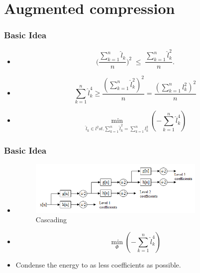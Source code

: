 \documentclass{beamer}
\begin{document}

\section{Augmented compression}
\begin{frame}
    \frametitle{Basic Idea}
    \begin{itemize}
        \item \[
                  \Big(\frac{\sum_{k=1}^{n}\hat{l}_k}{n}\Big)^2\;\le\;\frac{\sum_{k=1}^{n}\hat{l}_k^2}{n}.
              \]
        \item \[
                  \sum_{k=1}^{n}\hat{l}_k^4
                  \geq
                  \frac{(\sum_{k=1}^{n}\hat{l}_k^2)^2}{n}
                  =
                  \frac{(\sum_{k=1}^{n}l_k^2)^2}{n}
              \]
        \item \[
                  \min_{\hat{l}_k\in l^2 st. \sum_{k=1}^{n}\hat{l}_k^2=\sum_{k=1}^{n}l_k^2}(-\sum_{k=1}^{n}\hat{l}_k^4)
              \]
    \end{itemize}
\end{frame}
\begin{frame}
    \frametitle{Basic Idea}
    \begin{itemize}
        \item 	\begin{figure}
                  \centering
                  \includegraphics[width=0.8\textwidth]{fig/Wavelets_-_Filter_Bank.png}
                  \caption{Cascading}
                  \label{fig:Cascading}
              \end{figure}
        \item \[
                  \min_{\Phi}(-\sum_{k=1}^{n}\hat{l}_k^4)
              \]
        \item Condense the energy to as less coefficients as possible.
    \end{itemize}
\end{frame}
\end{document}
